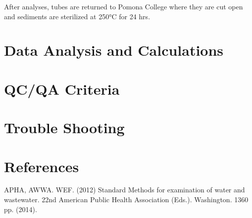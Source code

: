\documentclass[12pt]{../SOP3}\usepackage[]{graphicx}\usepackage[]{color}
\begin{document}
\NP After analyses, tubes are returned to Pomona College where they are cut open and sediments are sterilized at 250°C for 24 hrs. 


\NP

\section{Data Analysis and Calculations}

\section{QC/QA Criteria}

\section{Trouble Shooting}

\section{References}

\NP APHA, AWWA. WEF. (2012) Standard Methods for examination of water and wastewater. 22nd American Public Health Association (Eds.). Washington. 1360 pp. (2014).
\end{document}
